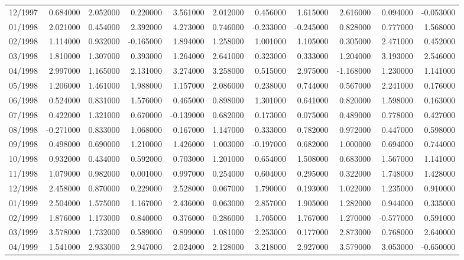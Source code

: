 \begin{tabular}{lrrrrrrrrrr}
12/1997 & 0.684000 & 2.052000 & 0.220000 & 3.561000 & 2.012000 & 0.456000 & 1.615000 & 2.616000 & 0.094000 & -0.053000 \\
01/1998 & 2.021000 & 0.454000 & 2.392000 & 4.273000 & 0.746000 & -0.233000 & -0.245000 & 0.828000 & 0.777000 & 1.568000 \\
02/1998 & 1.114000 & 0.932000 & -0.165000 & 1.894000 & 1.258000 & 1.001000 & 1.105000 & 0.305000 & 2.471000 & 0.452000 \\
03/1998 & 1.810000 & 1.307000 & 0.393000 & 1.264000 & 2.641000 & 0.323000 & 0.333000 & 1.204000 & 3.193000 & 2.546000 \\
04/1998 & 2.997000 & 1.165000 & 2.131000 & 3.274000 & 3.258000 & 0.515000 & 2.975000 & -1.168000 & 1.230000 & 1.141000 \\
05/1998 & 1.206000 & 1.461000 & 1.988000 & 1.157000 & 2.086000 & 0.238000 & 0.744000 & 0.567000 & 2.241000 & 0.176000 \\
06/1998 & 0.524000 & 0.831000 & 1.576000 & 0.465000 & 0.898000 & 1.301000 & 0.641000 & 0.820000 & 1.598000 & 0.163000 \\
07/1998 & 0.422000 & 1.321000 & 0.670000 & -0.139000 & 0.682000 & 0.173000 & 0.075000 & 0.489000 & 0.778000 & 0.427000 \\
08/1998 & -0.271000 & 0.833000 & 1.068000 & 0.167000 & 1.147000 & 0.333000 & 0.782000 & 0.972000 & 0.447000 & 0.598000 \\
09/1998 & 0.498000 & 0.690000 & 1.210000 & 1.426000 & 1.003000 & -0.197000 & 0.682000 & 1.000000 & 0.694000 & 0.744000 \\
10/1998 & 0.932000 & 0.434000 & 0.592000 & 0.703000 & 1.201000 & 0.654000 & 1.508000 & 0.683000 & 1.567000 & 1.141000 \\
11/1998 & 1.079000 & 0.982000 & 0.001000 & 0.997000 & 0.254000 & 0.604000 & 0.295000 & 0.322000 & 1.748000 & 1.428000 \\
12/1998 & 2.458000 & 0.870000 & 0.229000 & 2.528000 & 0.067000 & 1.790000 & 0.193000 & 1.022000 & 1.235000 & 0.910000 \\
01/1999 & 2.504000 & 1.575000 & 1.167000 & 2.436000 & 0.063000 & 2.857000 & 1.905000 & 1.282000 & 0.944000 & 0.335000 \\
02/1999 & 1.876000 & 1.173000 & 0.840000 & 0.376000 & 0.286000 & 1.705000 & 1.767000 & 1.270000 & -0.577000 & 0.591000 \\
03/1999 & 3.578000 & 1.732000 & 0.589000 & 0.899000 & 1.081000 & 2.253000 & 0.177000 & 2.873000 & 0.768000 & 2.640000 \\
04/1999 & 1.541000 & 2.933000 & 2.947000 & 2.024000 & 2.128000 & 3.218000 & 2.927000 & 3.579000 & 3.053000 & -0.650000 \\

\end{tabular}
